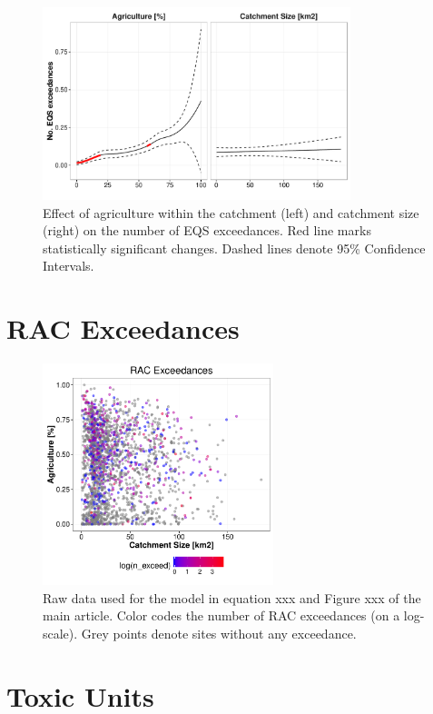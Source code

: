 \documentclass[pdftex,a4paper]{scrreprt}
\begin{document}
\begin{figure}
  \includegraphics[width=0.8\textwidth]{ezgagrieqsmodel}
  \caption{Effect of agriculture within the catchment (left) and catchment size (right) on the number of EQS exceedances. Red line marks statistically significant changes. Dashed lines denote 95\% Confidence Intervals.
  }
  \label{fig:ezgeqsagrimodel}
\end{figure}


\section{RAC Exceedances}
\begin{figure}[h]
	\centering
	\includegraphics[width = 0.6\textwidth]{ezgagrirac}
	\caption{Raw data used for the model in equation xxx and Figure xxx of the main article. Color codes the number of RAC exceedances (on a log-scale). Grey points denote sites without any exceedance.}
	\label{fig:ezgagrirac}
\end{figure}


\pagebreak
\section{Toxic Units}
\end{document}
